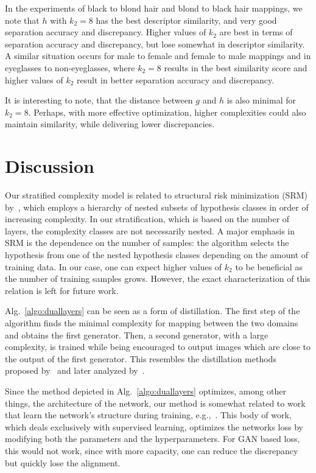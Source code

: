 \documentclass{article} %
\begin{document}
In the experiments of black to blond hair and blond to black hair mappings, we note that $h$ with $k_2=8$ has the best descriptor similarity, and very good separation accuracy and discrepancy. Higher values of $k_2$ are best in terms of separation accuracy and discrepancy, but lose somewhat in descriptor similarity. A similar situation occurs for male to female and female to male mappings and in eyeglasses to non-eyeglasses, where $k_2=8$ results in the best similarity score and higher values of $k_2$ result in better separation accuracy and discrepancy. 

It is interesting to note, that the distance between $g$ and $h$ is also minimal for $k_2=8$. Perhaps, with more effective optimization, higher complexities could also maintain similarity, while delivering lower discrepancies.

\section{Discussion}
\label{sec:discussion}

Our stratified complexity model is related to structural risk minimization (SRM) by~\cite{vc-ucrfep-71}, which employs a hierarchy of nested subsets of hypothesis classes in order of increasing complexity. In our stratification, which is based on the number of layers, the complexity classes are not necessarily nested. A major emphasis in SRM is the dependence on the number of samples: the algorithm selects the hypothesis from one of the nested hypothesis classes depending on the amount of training data. In our case, one can expect higher values of $k_2$ to be beneficial as the number of training samples grows. However, the exact characterization of this relation is left for future work.

Alg.~\ref{algo:duallayers} can be seen as a form of distillation. The first step of the algorithm finds the minimal complexity for mapping between the two domains and obtains the first generator. Then, a second generator, with a large complexity, is trained while being encouraged to output images which are close to the output of the first generator. This resembles the distillation methods proposed by~\cite{44873} and later analyzed by~\cite{DBLP:journals/corr/HandV17}.

Since the method depicted in Alg.~\ref{algo:duallayers} optimizes, among other things, the architecture of the network, our method is somewhat related to work that learn the network's structure during training, e.g.,~\citep{saxena:hal-01359150,wen2016learning,liu2015sparse,7410672,Lebedev_2016_CVPR}. This body of work, which deals exclusively with supervised learning, optimizes the networks loss by modifying both the parameters and the hyperparameters. For GAN based loss, this would not work, since with more capacity, one can reduce the discrepancy but quickly lose the alignment.
\end{document}
